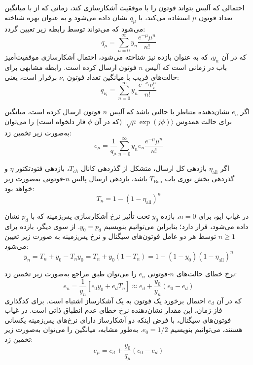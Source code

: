 احتمالی که آلیس بتواند فوتون را با موفقیت آشکارسازی کند، زمانی که از  با میانگین تعداد فوتون $\mu$ استفاده می‌کند، با $q_\mu$ نشان داده می‌شود و به عنوان بهره شناخته می‌شود که می‌تواند توسط رابطه زیر تعیین گردد:
\begin{equation}
	q_\mu = \sum_{n=0}^{\infty} y_n \frac{e^{-\mu} \mu^n}{n!}
	\label{eq:6-34}
\end{equation}
که در آن $y_n$، که به عنوان بازده نیز شناخته می‌شود، احتمال آشکارسازی موفقیت‌آمیز باب در زمانی است که آلیس $n$ فوتون ارسال کرده است. رابطه مشابهی برای حالت‌های فریب با میانگین تعداد فوتون $\nu_i$ برقرار است، یعنی:
\begin{equation}
	q_{\nu_i} = \sum_{n=0}^{\infty} y_n \frac{e^{-\nu_i} \nu_i^n}{n!}
	\label{eq:6-35}
\end{equation}

اگر $e_n$ نشان‌دهنده  متناظر با حالتی باشد که آلیس $n$ فوتون ارسال کرده است، میانگین  برای حالت همدوس $|\sqrt{\mu} \exp(j\phi)\rangle$ (که در آن $\phi$ فاز دلخواه است) را می‌توان به‌صورت زیر تخمین زد:
\begin{equation}
	e_\mu = \frac{1}{q_\mu} \sum_{n=0}^{\infty} y_n e_n \frac{e^{-\mu} \mu^n}{n!}
	\label{eq:6-36}
\end{equation}

اگر $\eta_{\text{all}}$ بازدهی کل ارسال، متشکل از گذردهی کانال $T_{ch}$، بازدهی فتودتکتور $\eta$ و گذردهی بخش نوری باب $T_{\text{Bob}}$ باشد، بازدهی ارسال پالس $n$-فوتونی به‌صورت زیر خواهد بود:
\begin{equation}
	T_n = 1 - (1 - \eta_{\text{all}})^n
	\label{eq:6-37}
\end{equation}

در غیاب ایو، برای $n=0$، بازده $y_0$ تحت تأثیر نرخ آشکارسازی پس‌زمینه که با $p_d$ نشان داده می‌شود، قرار دارد؛ بنابراین می‌توانیم بنویسیم $y_0 = p_d$. از سوی دیگر، بازده برای $n \geq 1$ توسط هر دو عامل فوتون‌های سیگنال و نرخ پس‌زمینه به صورت زیر تعیین می‌شود:
\begin{equation}
	y_n = T_n + y_0 - T_n y_0 = T_n + y_0(1 - T_n) = 1 - (1 - y_0)(1 - \eta_{\text{all}})^n
	\label{eq:6-38}
\end{equation}

نرخ خطای حالت‌های $n$-فوتونی $e_n$ را می‌توان طبق مراجع \cite{37, 70} به‌صورت زیر تخمین زد:
\begin{equation}
	e_n = \frac{1}{y_n} \left[ e_0 y_0 + e_d T_n \right] \approx e_d + \frac{y_0}{y_n} (e_0 - e_d)
	\label{eq:6-39}
\end{equation}
که در آن $e_d$ احتمال برخورد یک فوتون به یک آشکارساز اشتباه است. برای کدگذاری فاز-زمان، این مقدار نشان‌دهنده نرخ خطای عدم انطباق ذاتی است. در غیاب فوتون‌های سیگنال، با فرض اینکه دو آشکارساز دارای نرخ‌های پس‌زمینه یکسانی هستند، می‌توانیم بنویسیم $e_0 = 1/2$. به‌طور مشابه، میانگین  را می‌توان به‌صورت زیر تخمین زد:
\begin{equation}
	e_\mu = e_d + \frac{y_0}{q_\mu} (e_0 - e_d)
	\label{eq:6-40}
\end{equation}

